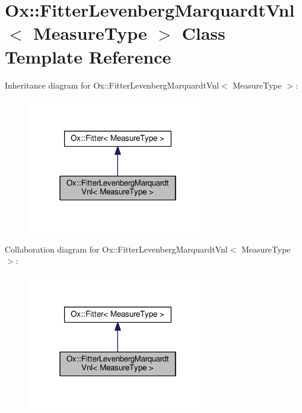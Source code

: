 \hypertarget{class_ox_1_1_fitter_levenberg_marquardt_vnl}{\section{Ox\-:\-:Fitter\-Levenberg\-Marquardt\-Vnl$<$ Measure\-Type $>$ Class Template Reference}
\label{class_ox_1_1_fitter_levenberg_marquardt_vnl}
}


Inheritance diagram for Ox\-:\-:Fitter\-Levenberg\-Marquardt\-Vnl$<$ Measure\-Type $>$\-:
\nopagebreak
\begin{figure}[H]
\begin{center}
\leavevmode
\includegraphics[width=226pt]{class_ox_1_1_fitter_levenberg_marquardt_vnl__inherit__graph}
\end{center}
\end{figure}


Collaboration diagram for Ox\-:\-:Fitter\-Levenberg\-Marquardt\-Vnl$<$ Measure\-Type $>$\-:
\nopagebreak
\begin{figure}[H]
\begin{center}
\leavevmode
\includegraphics[width=226pt]{class_ox_1_1_fitter_levenberg_marquardt_vnl__coll__graph}
\end{center}
\end{figure}
